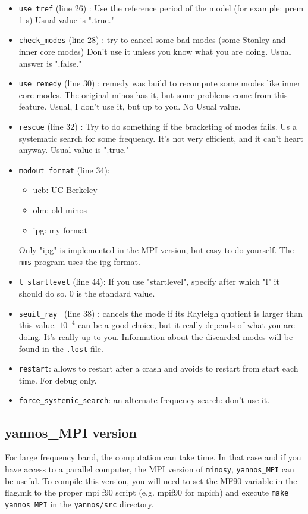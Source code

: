 \documentclass[11pt]{article}
\begin{document}
\begin{itemize}
\item {\tt use\_tref} (line 26)     : Use the reference period of the model (for  example: prem
                1 s)
	    Usual value is ".true." 
\item {\tt check\_modes} (line 28)  : try to cancel some bad modes (some Stonley and inner core modes)
                Don't use it unless you know what you are doing.
              Usual answer is ".false."
\item {\tt use\_remedy} (line 30)  : remedy was build to recompute some modes like inner core modes.
              The original minos has it, but some problems come from this feature.
            Usual, I don't use it, but up to you.
            No Usual value.
\item {\tt rescue} (line 32) : Try to do something if the bracketing of modes fails. Us a systematic 
	    search for some frequency. It's not very efficient, and it can't heart
            anyway.
            Usual value is ".true." 
\item {\tt modout\_format} (line 34): 
\begin{itemize}	
\item ucb: UC Berkeley
\item                 olm: old minos
\item                 ipg: my format
\end{itemize}	
 Only "ipg" is implemented in the MPI version, but easy to do
yourself. The {\tt nms} program uses the ipg format.
\item {\tt l\_startlevel} (line 44): If you use "startlevel", specify after which "l" it should do so.
0 is the standard value.
\item {\tt seuil\_ray } (line 38) : cancels the mode if its Rayleigh
quotient is larger than this value. 
             $10^{-4}$ can be a good choice, but it really depends of what you are doing.
             It's really up to you. Information about the discarded
modes
will be found in the {\tt .lost} file.
\item {\tt restart}: allows to restart after a crash and avoids to
restart from start each time. For debug only.
\item {\tt force\_systemic\_search}: an alternate frequency search:
don't use it.
\end{itemize}	
\subsection{yannos\_MPI version}
For large frequency band, the computation can take time.
In that case and if you have access to a parallel computer, the MPI
version of {\tt minosy}, {\tt yannos\_MPI} can be useful.
To compile this version, you will need to set the MF90 variable in the
flag.mk to the proper mpi f90 script (e.g. mpif90 for mpich) and
execute {\tt make yannos\_MPI} in the  {\tt yannos/src} directory.
\end{document}
